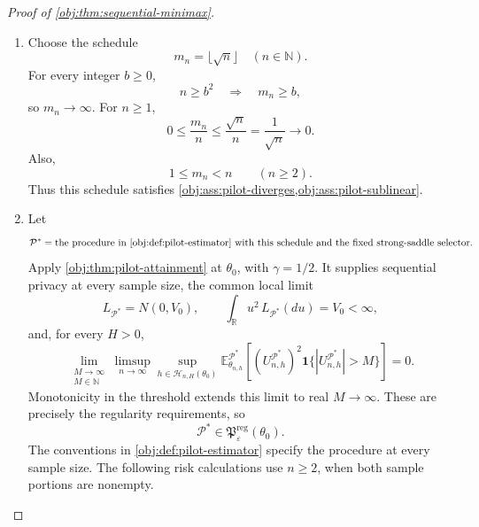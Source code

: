 \documentclass[11pt]{article}
\begin{document}
\begin{proof}[Proof of \cref{obj:thm:sequential-minimax}]
\begin{enumerate}
\item
Choose the schedule
\[
m_n=\lfloor\sqrt n\rfloor\quad(n\in\mathbb N).
\]
For every integer \(b\ge0\),
\[
n\ge b^2\quad\Longrightarrow\quad m_n\ge b,
\]
so \(m_n\to\infty\). For \(n\ge1\),
\[
0\le\frac{m_n}{n}
\le\frac{\sqrt n}{n}
=\frac1{\sqrt n}\longrightarrow0.
\]
Also,
\[
1\le m_n<n\qquad(n\ge2).
\]
Thus this schedule satisfies
\cref{obj:ass:pilot-diverges,obj:ass:pilot-sublinear}.

\item
Let
\[
\mathcal P^*
=
\text{the procedure in \cref{obj:def:pilot-estimator}
with this schedule and the fixed strong-saddle selector}.
\]
Apply \cref{obj:thm:pilot-attainment} at \(\theta_0\), with \(\gamma=1/2\). It supplies sequential privacy at every sample size, the common local limit
\[
L_{\mathcal P^*}=N(0,V_0),
\qquad
\int_{\mathbb R}u^2\,L_{\mathcal P^*}(du)=V_0<\infty,
\]
and, for every \(H>0\),
\[
\lim_{\substack{M\to\infty\\M\in\mathbb N}}
\limsup_{n\to\infty}
\sup_{h\in\mathcal H_{n,H}(\theta_0)}
\mathbb E_{\theta_{n,h}}^{\mathcal P^*}
\!\left[
(U_{n,h}^{\mathcal P^*})^2
\mathbf1\{|U_{n,h}^{\mathcal P^*}|>M\}
\right]
=0.
\]
Monotonicity in the threshold extends this limit to real \(M\to\infty\). These are precisely the regularity requirements, so
\[
\mathcal P^*\in\mathfrak P^{\mathrm{reg}}_\varepsilon(\theta_0).
\]
The conventions in \cref{obj:def:pilot-estimator} specify the procedure at every sample size. The following risk calculations use \(n\ge2\), when both sample portions are nonempty.


\end{enumerate}
\end{proof}
\end{document}
